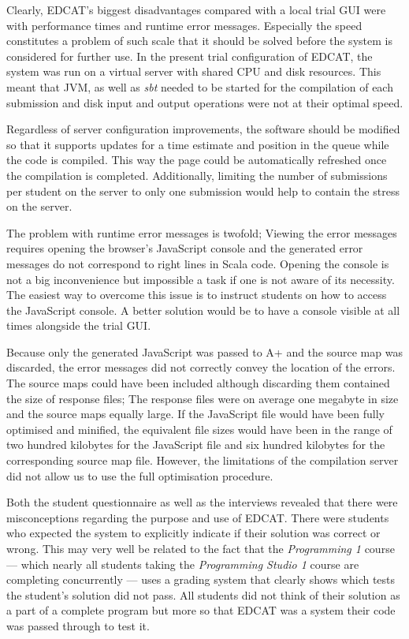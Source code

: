 Clearly, EDCAT's biggest disadvantages compared with a local trial GUI were with performance times and runtime error messages. Especially the speed constitutes a problem of such scale that it should be solved before the system is considered for further use. In the present trial configuration of EDCAT, the system was run on a virtual server with shared CPU and disk resources. This meant that JVM, as well as \emph{sbt} needed to be started for the compilation of each submission and disk input and output operations were not at their optimal speed.

Regardless of server configuration improvements, the software should be modified so that it supports updates for a time estimate and position in the queue while the code is compiled. This way the page could be automatically refreshed once the compilation is completed. Additionally, limiting the number of submissions per student on the server to only one submission would help to contain the stress on the server.

The problem with runtime error messages is twofold; Viewing the error messages requires opening the browser's JavaScript console and the generated error messages do not correspond to right lines in Scala code. Opening the console is not a big inconvenience but impossible a task if one is not aware of its necessity. The easiest way to overcome this issue is to instruct students on how to access the JavaScript console. A better solution would be to have a console visible at all times alongside the trial GUI.

Because only the generated JavaScript was passed to A+ and the source map was discarded, the error messages did not correctly convey the location of the errors. The source maps could have been included although discarding them contained the size of response files; The response files were on average one megabyte in size and the source maps equally large. If the JavaScript file would have been fully optimised and minified, the equivalent file sizes would have been in the range of two hundred kilobytes for the JavaScript file and six hundred kilobytes for the corresponding source map file. However, the limitations of the compilation server did not allow us to use the full optimisation procedure.

Both the student questionnaire as well as the interviews revealed that there were misconceptions regarding the purpose and use of EDCAT. There were students who expected the system to explicitly indicate if their solution was correct or wrong. This may very well be related to the fact that the \emph{Programming 1} course --- which nearly all students taking the \emph{Programming Studio 1} course are completing concurrently --- uses a grading system that clearly shows which tests the student's solution did not pass. All students did not think of their solution as a part of a complete program but more so that EDCAT was a system their code was passed through to test it.


